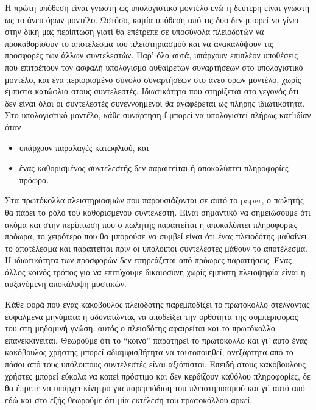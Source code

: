 \documentclass[letterpaper,11pt]{article}
\begin{document}
Η πρώτη υπόθεση είναι γνωστή ως υπολογιστικό μοντέλο ενώ η δεύτερη είναι γνωστή ως το άνευ όρων μοντέλο.
Ωστόσο, καμία υπόθεση από τις δυο δεν μπορεί να γίνει στην δική μας περίπτωση γιατί θα επέτρεπε σε υποσύνολα
πλειοδοτών να προκαθορίσουν το αποτέλεσμα του πλειστηριασμού και να ανακαλύψουν τις προσφορές των άλλων
συντελεστών. Παρ' όλα αυτά, υπάρχουν επιπλέον υποθέσεις που επιτρέπουν τον ασφαλή υπολογισμό αυθαίρετων
συναρτήσεων στο υπολογιστικό μοντέλο, και ένα περιορισμένο σύνολο συναρτήσεων στο άνευ όρων μοντέλο, χωρίς
έμπιστα κατώφλια στους συντελεστές. Ιδιωτικότητα που στηρίζεται στο γεγονός ότι δεν είναι όλοι οι συντελεστές
συνεννοημένοι θα αναφέρεται ως πλήρης ιδιωτικότητα. Στο υπολογιστικό μοντέλο, κάθε συνάρτηση f μπορεί να
υπολογιστεί πλήρως κατ'ιδίαν όταν 
\begin{itemize}
	\item υπάρχουν παραλαγές κατωφλιού, και 
	\item ένας καθορισμένος συντελεστής δεν παραιτείται ή αποκαλύπτει πληροφορίες πρόωρα.
\end{itemize}

Στα πρωτόκολλα πλειστηριασμών που παρουσιάζονται σε αυτό το paper, ο πωλητής θα πάρει το ρόλο του καθορισμένου
συντελεστή. Είναι σημαντικό να σημειώσουμε ότι ακόμα και στην περίπτωση που ο πωλητής παραιτείται ή
αποκαλύπτει πληροφορίες πρόωρα, το χειρότερο που θα μπορούσε να συμβεί είναι ότι ένας πλειοδότης μαθαίνει το
αποτέλεσμα και παραιτείται πριν οι υπόλοιποι συντελεστές μάθουν το αποτέλεσμα. Η ιδιωτικότητα των προσφορών
δεν επηρεάζεται από πρόωρες παραιτήσεις. Ένας άλλος κοινός τρόπος για να επιτύχουμε δικαιοσύνη χωρίς έμπιστη
πλειοψηφία είναι η αυξανόμενη αποκάλυψη μυστικών.

Κάθε φορά που ένας κακόβουλος πλειοδότης παρεμποδίζει το πρωτόκολλο στέλνοντας εσφαλμένα μηνύματα ή
αδυνατώντας να αποδείξει την ορθότητα της συμπεριφοράς του στη μηδαμινή γνώση, αυτός ο πλειοδότης αφαιρείται
και το πρωτόκολλο επανεκκινείται. Θεωρούμε ότι το “κοινό” παρατηρεί το πρωτόκολλο και γι’ αυτό ένας κακόβουλος
χρήστης μπορεί αδιαμφισβήτητα να ταυτοποιηθεί, ανεξάρτητα από το πόσοι από τους υπόλοιπους συντελεστές είναι
αξιόπιστοι. Επειδή στους κακόβουλους χρήστες μπορεί εύκολα να κοπεί πρόστιμο και δεν κερδίζουν καθόλου
πληροφορίες, δε θα έπρεπε να υπάρχει κίνητρο για παρεμπόδιση του πλειστηριασμού και γι’ αυτό από εδώ και στο
εξής θεωρούμε ότι μία εκτέλεση του πρωτοκόλλου αρκεί.
\end{document}
